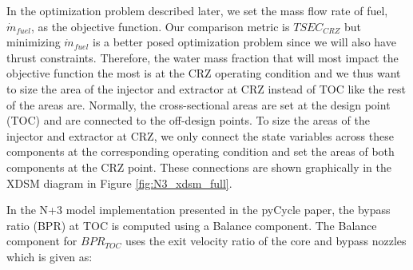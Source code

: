 \documentclass[conf]{new-aiaa}
\begin{document}

In the optimization problem described later, we set the mass flow rate of fuel, $\dot{m}_{fuel}$, as the objective function.
Our comparison metric is $TSEC_{CRZ}$ but minimizing $\dot{m}_{fuel}$ is a better posed optimization problem since we will also have thrust constraints.
Therefore, the water mass fraction that will most impact the objective function the most is at the CRZ operating condition and we thus want to size the area of the injector and extractor at CRZ instead of TOC like the rest of the areas are.
Normally, the cross-sectional areas are set at the design point (TOC) and are connected to the off-design points.
To size the areas of the injector and extractor at CRZ, we only connect the state variables across these components at the corresponding operating condition and set the areas of both components at the CRZ point.
These connections are shown graphically in the XDSM diagram in Figure \ref{fig:N3_xdsm_full}.

In the N+3 model implementation presented in the pyCycle paper, the bypass ratio (BPR) at TOC is computed using a Balance component.
The Balance component for $BPR_{TOC}$ uses the exit velocity ratio of the core and bypass nozzles which is given as:
\end{document}
